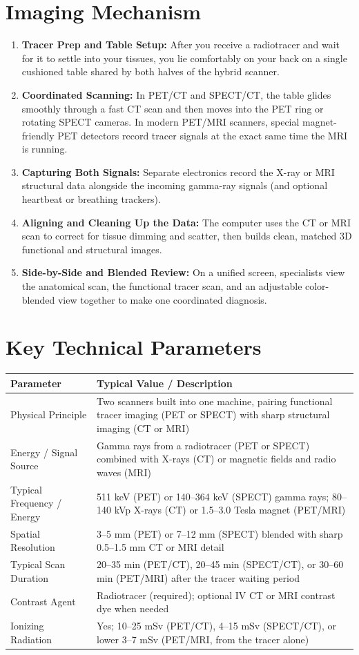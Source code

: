 \section{Imaging Mechanism}
\begin{enumerate}
    \item \textbf{Tracer Prep and Table Setup:} After you receive a radiotracer and wait for it to settle into your tissues, you lie comfortably on your back on a single cushioned table shared by both halves of the hybrid scanner.
    \item \textbf{Coordinated Scanning:} In PET/CT and SPECT/CT, the table glides smoothly through a fast CT scan and then moves into the PET ring or rotating SPECT cameras. In modern PET/MRI scanners, special magnet-friendly PET detectors record tracer signals at the exact same time the MRI is running.
    \item \textbf{Capturing Both Signals:} Separate electronics record the X-ray or MRI structural data alongside the incoming gamma-ray signals (and optional heartbeat or breathing trackers).
    \item \textbf{Aligning and Cleaning Up the Data:} The computer uses the CT or MRI scan to correct for tissue dimming and scatter, then builds clean, matched 3D functional and structural images.
    \item \textbf{Side-by-Side and Blended Review:} On a unified screen, specialists view the anatomical scan, the functional tracer scan, and an adjustable color-blended view together to make one coordinated diagnosis.
\end{enumerate}

\section{Key Technical Parameters}
\noindent
\begin{tabularx}{\textwidth}{@{}l X@{}}
\toprule
\textbf{Parameter} & \textbf{Typical Value / Description} \\
\midrule
Physical Principle & Two scanners built into one machine, pairing functional tracer imaging (PET or SPECT) with sharp structural imaging (CT or MRI) \\
Energy / Signal Source & Gamma rays from a radiotracer (PET or SPECT) combined with X-rays (CT) or magnetic fields and radio waves (MRI) \\
Typical Frequency / Energy & 511 keV (PET) or 140--364 keV (SPECT) gamma rays; 80--140 kVp X-rays (CT) or 1.5--3.0 Tesla magnet (PET/MRI) \\
Spatial Resolution & 3--5 mm (PET) or 7--12 mm (SPECT) blended with sharp 0.5--1.5 mm CT or MRI detail \\
Typical Scan Duration & 20--35 min (PET/CT), 20--45 min (SPECT/CT), or 30--60 min (PET/MRI) after the tracer waiting period \\
Contrast Agent & Radiotracer (required); optional IV CT or MRI contrast dye when needed \\
Ionizing Radiation & Yes; 10--25 mSv (PET/CT), 4--15 mSv (SPECT/CT), or lower 3--7 mSv (PET/MRI, from the tracer alone) \\
\bottomrule
\end{tabularx}

